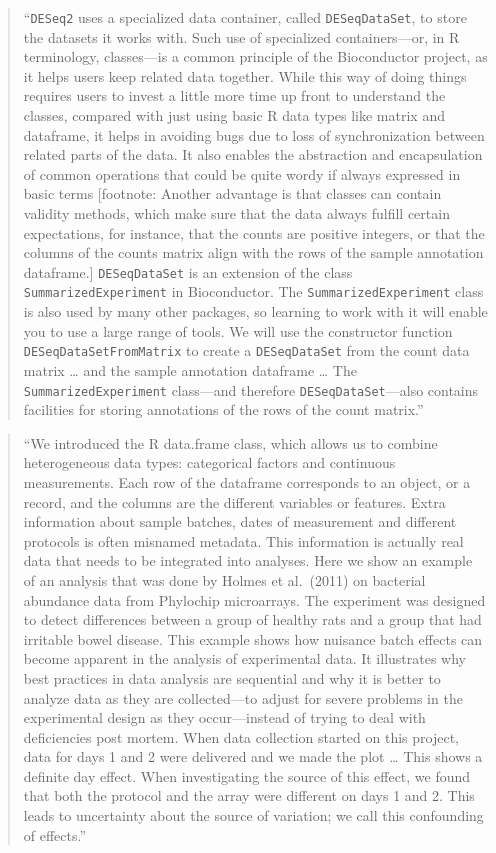 \documentclass[]{tufte-book}
\begin{document}
\begin{quote}
``\texttt{DESeq2} uses a specialized data container, called \texttt{DESeqDataSet}, to
store the datasets it works with. Such use of specialized containers---or,
in R terminology, classes---is a common principle of the Bioconductor
project, as it helps users keep related data together. While this way of
doing things requires users to invest a little more time up front to
understand the classes, compared with just using basic R data types like
matrix and dataframe, it helps in avoiding bugs due to loss of
synchronization between related parts of the data. It also enables the
abstraction and encapsulation of common operations that could be quite
wordy if always expressed in basic terms {[}footnote: Another advantage is that
classes can contain validity methods, which make sure that the data always
fulfill certain expectations, for instance, that the counts are positive
integers, or that the columns of the counts matrix align with the rows
of the sample annotation dataframe.{]} \texttt{DESeqDataSet} is an extension of the
class \texttt{SummarizedExperiment} in Bioconductor. The \texttt{SummarizedExperiment} class
is also used by many other packages, so learning to work with it will
enable you to use a large range of tools. We will use the constructor function
\texttt{DESeqDataSetFromMatrix} to create a \texttt{DESeqDataSet} from the count data matrix
\ldots{} and the sample annotation dataframe \ldots{} The \texttt{SummarizedExperiment} class---and
therefore \texttt{DESeqDataSet}---also contains facilities for storing annotations
of the rows of the count matrix.'' \citep{holmes2018modern}
\end{quote}

\begin{quote}
``We introduced the R data.frame class, which allows us to combine
heterogeneous data types: categorical factors and continuous measurements.
Each row of the dataframe corresponds to an object, or a record, and the
columns are the different variables or features. Extra information about
sample batches, dates of measurement and different protocols is often
misnamed metadata. This information is actually real data that needs to
be integrated into analyses. Here we show an example of an analysis that was
done by Holmes et al.~(2011) on bacterial abundance data from Phylochip microarrays.
The experiment was designed to detect differences between a group of healthy
rats and a group that had irritable bowel disease. This example shows how
nuisance batch effects can become apparent in the analysis of experimental
data. It illustrates why best practices in data analysis are sequential and
why it is better to analyze data as they are collected---to adjust for severe
problems in the experimental design as they occur---instead of trying to deal
with deficiencies post mortem. When data collection started on this project, data
for days 1 and 2 were delivered and we made the plot \ldots{} This shows a definite
day effect. When investigating the source of this effect, we found that both the
protocol and the array were different on days 1 and 2. This leads to uncertainty
about the source of variation; we call this confounding of effects.''
\citep{holmes2018modern}
\end{quote}
\end{document}
